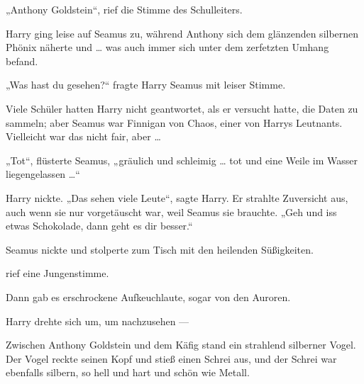 „Anthony Goldstein“, rief die Stimme des Schulleiters.

Harry ging leise auf Seamus zu, während Anthony sich dem glänzenden silbernen Phönix näherte und … was auch immer sich unter dem zerfetzten Umhang befand.

„Was hast du gesehen?“ fragte Harry Seamus mit leiser Stimme.

Viele Schüler hatten Harry nicht geantwortet, als er versucht hatte, die Daten zu sammeln; aber Seamus war Finnigan von Chaos, einer von Harrys Leutnants. Vielleicht war das nicht fair, aber …

„Tot“, flüsterte Seamus, „gräulich und schleimig … tot und eine Weile im Wasser liegengelassen …“

Harry nickte. „Das sehen viele Leute“, sagte Harry. Er strahlte Zuversicht aus, auch wenn sie nur vorgetäuscht war, weil Seamus sie brauchte. „Geh und iss etwas Schokolade, dann geht es dir besser.“

Seamus nickte und stolperte zum Tisch mit den heilenden Süßigkeiten.

 rief eine Jungenstimme.

Dann gab es erschrockene Aufkeuchlaute, sogar von den Auroren.

Harry drehte sich um, um nachzusehen —

Zwischen Anthony Goldstein und dem Käfig stand ein strahlend silberner Vogel. Der Vogel reckte seinen Kopf und stieß einen Schrei aus, und der Schrei war ebenfalls silbern, so hell und hart und schön wie Metall.

